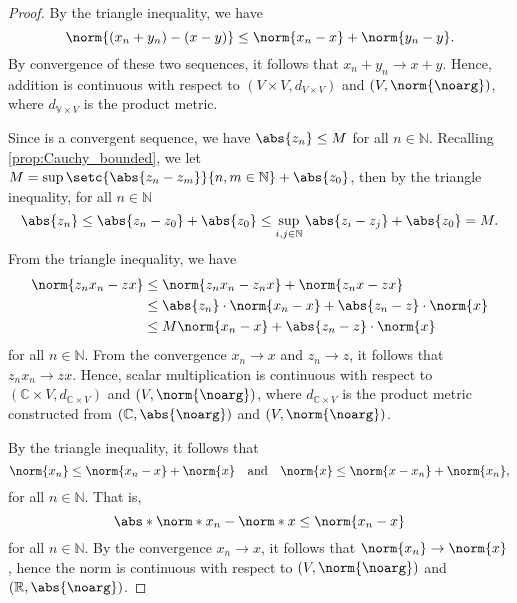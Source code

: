 \begin{proof}
    By the triangle inequality, we have
    \begin{equation*}
        \norm{(x_n + y_n) - (x - y)} \leq \norm{x_n - x} + \norm{y_n - y}.
    \end{equation*}
    By convergence of these two sequences, it follows that \(x_n + y_n \to x + y\). Hence, addition is continuous with respect to \((V \times V, d_{V\times V})\) and \((V, \norm{\noarg})\), where \(d_{\mathbb{V}\times V}\) is the product metric.

    Since  is a convergent sequence, we have \(\abs{z_n} \leq M\) for all \(n \in \mathbb{N}\). Recalling \cref{prop:Cauchy_bounded}, we let \(M = \sup\setc{\abs{z_n - z_m}}{n,m \in \mathbb{N}} + \abs{z_0}\), then by the triangle inequality, for all \(n \in \mathbb{N}\)
    \begin{equation*}
        \abs{z_n} \leq \abs{z_n - z_0} + \abs{z_0} \leq \sup_{i,j \in \mathbb{N}}{\abs{z_i - z_j}} + \abs{z_0} = M.
    \end{equation*}
    From the triangle inequality, we have
    \begin{align*}
        \norm{z_n x_n - zx} &\leq \norm{z_n x_n - z_n x} + \norm{z_n x - zx}\\
                            &\leq \abs{z_n}\cdot \norm{x_n - x} + \abs{z_n - z}\cdot \norm{x}\\
                            &\leq M \norm{x_n - x} + \abs{z_n - z}\cdot\norm{x}
    \end{align*}
    for all \(n \in \mathbb{N}\). From the convergence \(x_n \to x\) and \(z_n \to z\), it follows that \(z_n x_n \to zx\). Hence, scalar multiplication is continuous with respect to \((\mathbb{C} \times V, d_{\mathbb{C}\times V})\) and \((V, \norm{\noarg})\), where \(d_{\mathbb{C}\times V}\) is the product metric constructed from \((\mathbb{C}, \abs{\noarg})\) and \((V, \norm{\noarg})\).

    By the triangle inequality, it follows that
    \begin{equation*}
        \norm{x_n} \leq \norm{x_n - x} + \norm{x}\quad\text{and}\quad \norm{x} \leq \norm{x - x_n} + \norm{x_n},
    \end{equation*}
    for all \(n \in \mathbb{N}\). That is,
    \begin{equation*}
        \abs*{\norm*{x_n} - \norm*{x}} \leq \norm{x_n - x}
    \end{equation*}
    for all \(n \in \mathbb{N}\). By the convergence \(x_n \to x\), it follows that \(\norm{x_n} \to \norm{x}\), hence the norm is continuous with respect to \((V, \norm{\noarg})\) and \((\mathbb{R}, \abs{\noarg})\).
\end{proof}


